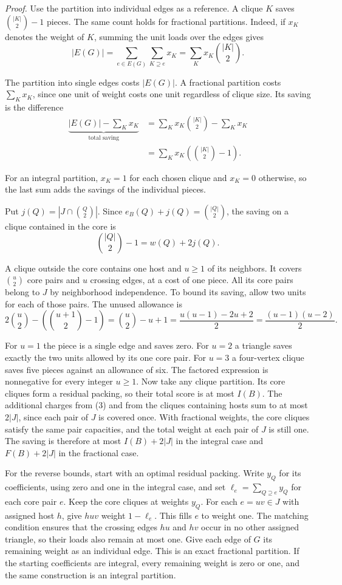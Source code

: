 \documentclass[english,11pt,a4paper]{article}
\begin{document}
\emph{Proof.} Use the partition into individual edges as a reference. A clique \(K\) saves \(\binom{|K|}{2}-1\) pieces. The same count holds for fractional partitions. Indeed, if \(x_K\) denotes the weight of \(K\), summing the unit loads over the edges gives
\[
|E(G)|=\sum_{e\in E(G)}\sum_{K\supseteq e}x_K
       =\sum_K x_K\binom{|K|}{2}.
\]

The partition into single edges costs \(|E(G)|\). A fractional partition costs \(\sum_K x_K\), since one unit of weight costs one unit regardless of clique size. Its saving is the difference
\[
\begin{aligned}
\underbrace{|E(G)|-\sum_K x_K}_{\text{total saving}}
 &=\sum_K x_K\binom{|K|}{2}-\sum_K x_K\\
 &=\sum_K x_K\left(\binom{|K|}{2}-1\right).
\end{aligned}
\]

For an integral partition, \(x_K=1\) for each chosen clique and \(x_K=0\) otherwise, so the last sum adds the savings of the individual pieces.

Put \(j(Q)=|J\cap\binom{Q}{2}|\). Since \(e_B(Q)+j(Q)=\binom{|Q|}{2}\), the saving on a clique contained in the core is
\[
\binom{|Q|}{2}-1=w(Q)+2j(Q). \tag{3}
\]

A clique outside the core contains one host and \(u\ge1\) of its neighbors. It covers \(\binom u2\) core pairs and \(u\) crossing edges, at a cost of one piece. All its core pairs belong to \(J\) by neighborhood independence. To bound its saving, allow two units for each of those pairs. The unused allowance is
\[
2\binom u2-\left(\binom{u+1}{2}-1\right)
=\binom u2-u+1
=\frac{u(u-1)-2u+2}{2}
=\frac{(u-1)(u-2)}2.
\]

For \(u=1\) the piece is a single edge and saves zero. For \(u=2\) a triangle saves exactly the two units allowed by its one core pair. For \(u=3\) a four-vertex clique saves five pieces against an allowance of six. The factored expression is nonnegative for every integer \(u\ge1\). Now take any clique partition. Its core cliques form a residual packing, so their total score is at most \(I(B)\). The additional charges from (3) and from the cliques containing hosts sum to at most \(2|J|\), since each pair of \(J\) is covered once. With fractional weights, the core cliques satisfy the same pair capacities, and the total weight at each pair of \(J\) is still one. The saving is therefore at most \(I(B)+2|J|\) in the integral case and \(F(B)+2|J|\) in the fractional case.

For the reverse bounds, start with an optimal residual packing. Write \(y_Q\) for its coefficients, using zero and one in the integral case, and set \(\ell_e=\sum_{Q\supseteq e}y_Q\) for each core pair \(e\). Keep the core cliques at weights \(y_Q\). For each \(e=uv\in J\) with assigned host \(h\), give \(huv\) weight \(1-\ell_e\). This fills \(e\) to weight one. The matching condition ensures that the crossing edges \(hu\) and \(hv\) occur in no other assigned triangle, so their loads also remain at most one. Give each edge of \(G\) its remaining weight as an individual edge. This is an exact fractional partition. If the starting coefficients are integral, every remaining weight is zero or one, and the same construction is an integral partition.
\end{document}
